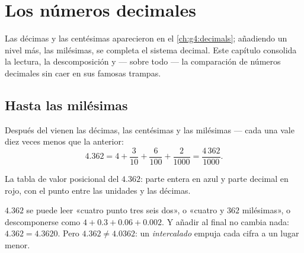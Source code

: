 \chapter{Los números decimales}\label{ch:g5:decimals}

Las décimas y las centésimas aparecieron en el \cref{ch:g4:decimals}; añadiendo un
nivel más, las milésimas, se completa el sistema decimal. Este capítulo
consolida la lectura, la descomposición y --- sobre todo --- la comparación de
números decimales sin caer en sus famosas trampas.

\section{Hasta las milésimas}

\begin{definition}\label{def:g5:decimals:places}
Después del  vienen las décimas, las centésimas y las
milésimas --- cada una vale diez veces menos que la anterior:
\[
4.362 = 4 + \frac{3}{10} + \frac{6}{100} + \frac{2}{1000}
= \frac{4\,362}{1000}.
\]
\end{definition}

\begin{omfigure}

{\small La tabla de valor posicional del $4.362$: parte entera en azul y parte
decimal en rojo, con el punto entre las unidades y las décimas.}
\end{omfigure}

\begin{example}\label{ex:g5:decimals:readings}
$4.362$ se puede leer «cuatro punto tres seis dos», o «cuatro y
$362$ milésimas», o descomponerse como $4 + 0.3 + 0.06 + 0.002$. Y
añadir  al final no cambia nada: $4.362 = 4.3620$. Pero
$4.362 \neq 4.0362$: un  \emph{intercalado} empuja cada cifra a un
lugar menor.
\end{example}


